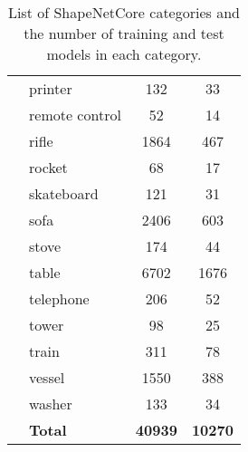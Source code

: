 \begin{table}[]
\begin{tabular}[t]{llcc}
		             & printer           & 132            & 33             \\
		             & remote control    & 52             & 14             \\
		             & rifle             & 1864           & 467            \\
		             & rocket            & 68             & 17             \\
		             & skateboard        & 121            & 31             \\
		             & sofa              & 2406           & 603            \\
		             & stove             & 174            & 44             \\
		             & table             & 6702           & 1676           \\
		             & telephone         & 206            & 52             \\
		             & tower             & 98             & 25             \\
		             & train             & 311            & 78             \\
		             & vessel            & 1550           & 388            \\
		             & washer            & 133            & 34             \\
		             & \textbf{Total}    & \textbf{40939} & \textbf{10270} \\ \hline
	\end{tabular}
	
	
	\caption{List of ShapeNetCore categories and the number of training and test models in each category.}
	\label{Table:shapenetcats}
\end{table}